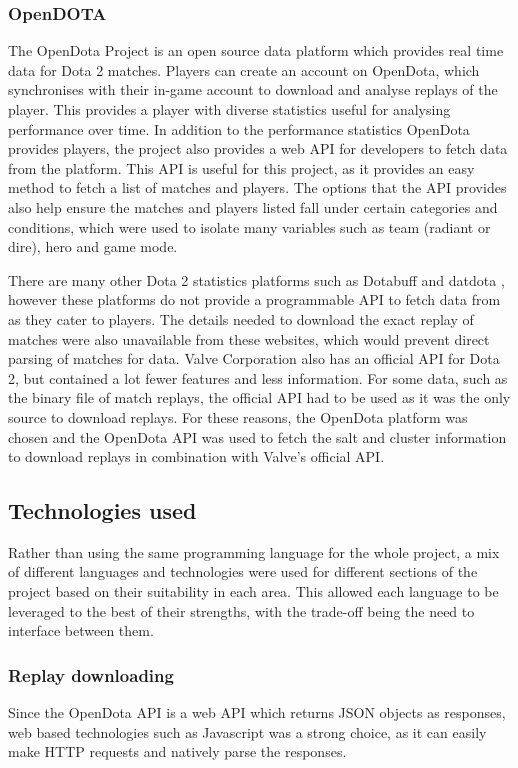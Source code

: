 \documentclass[Report.tex]{subfiles}
\begin{document}
\subsubsection{OpenDOTA}
The OpenDota Project \cite{opendota} is an open source data platform which provides real time data for Dota 2 matches. Players can create an account on OpenDota, which synchronises with their in-game account to download and analyse replays of the player. This provides a player with diverse statistics useful for analysing performance over time. In addition to the performance statistics OpenDota provides players, the project also provides a web API for developers to fetch data from the platform. This API is useful for this project, as it provides an easy method to fetch a list of matches and players. The options that the API provides also help ensure the matches and players listed fall under certain categories and conditions, which were used to isolate many variables such as team (radiant or dire), hero and game mode. 

There are many other Dota 2 statistics platforms such as Dotabuff \cite{dotabuff} and datdota \cite{datdota}, however these platforms do not provide a programmable API to fetch data from as they cater to players. The details needed to download the exact replay of matches were also unavailable from these websites, which would prevent direct parsing of matches for data. Valve Corporation also has an official API for Dota 2, but contained a lot fewer features and less information. For some data, such as the binary file of match replays, the official API had to be used as it was the only source to download replays. For these reasons, the OpenDota platform was chosen and the OpenDota API was used to fetch the salt and cluster information to download replays in combination with Valve's official API. 


\subsection{Technologies used}
Rather than using the same programming language for the whole project, a mix of different languages and technologies were used for different sections of the project based on their suitability in each area. This allowed each language to be leveraged to the best of their strengths, with the trade-off being the need to interface between them.
 
\subsubsection{Replay downloading}
Since the OpenDota API is a web API which returns JSON objects as responses, web based technologies such as Javascript was a strong choice, as it can easily make HTTP requests and natively parse the responses. 
\end{document}
